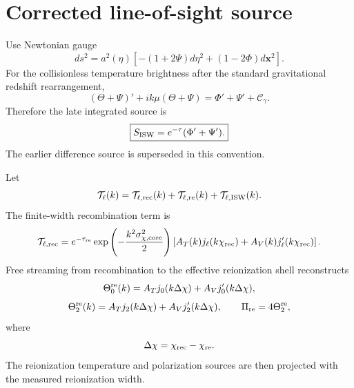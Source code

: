 \section{Corrected line-of-sight source}

Use Newtonian gauge
\begin{equation}
ds^2
=a^2(\eta)
\left[-(1+2\Psi)d\eta^2+(1-2\Phi)d\boldsymbol x^2\right].
\label{eq:trl-newtonian-gauge}
\end{equation}
For the collisionless temperature brightness after the standard gravitational redshift rearrangement,
\begin{equation}
(\Theta+\Psi)'
+ik\mu(\Theta+\Psi)
=
\Phi'+\Psi'+\mathcal C_\gamma.
\label{eq:trl-los-eq}
\end{equation}
Therefore the late integrated source is
\begin{equation}
\boxed{
S_{\rm ISW}=e^{-\tau}(\Phi'+\Psi').
}
\label{eq:trl-isw-source}
\end{equation}
The earlier difference source is superseded in this convention.

Let
\begin{equation}
\mathcal T_\ell(k)
=\mathcal T_{\ell,{\rm rec}}(k)
+\mathcal T_{\ell,{\rm re}}(k)
+\mathcal T_{\ell,{\rm ISW}}(k).
\label{eq:trl-total-transfer}
\end{equation}
The finite-width recombination term is
\begin{equation}
\mathcal T_{\ell,{\rm rec}}
=e^{-\tau_{\rm re}}
\exp\left(-\frac{k^2\sigma_{\chi,{\rm core}}^2}{2}\right)
\left[
A_T(k)j_\ell(k\chi_{\rm rec})
+A_V(k)j_\ell'(k\chi_{\rm rec})
\right].
\label{eq:trl-rec-transfer}
\end{equation}
Free streaming from recombination to the effective reionization shell reconstructs
\begin{equation}
\Theta_0^{\rm re}(k)
=A_Tj_0(k\Delta\chi)+A_Vj_0'(k\Delta\chi),
\label{eq:trl-reion-monopole}
\end{equation}
\begin{equation}
\Theta_2^{\rm re}(k)
=A_Tj_2(k\Delta\chi)+A_Vj_2'(k\Delta\chi),
\qquad
\Pi_{\rm re}=4\Theta_2^{\rm re},
\label{eq:trl-reion-quadrupole}
\end{equation}
where
\begin{equation}
\Delta\chi=\chi_{\rm rec}-\chi_{\rm re}.
\label{eq:trl-deltachi}
\end{equation}
The reionization temperature and polarization sources are then projected with the measured reionization width.

